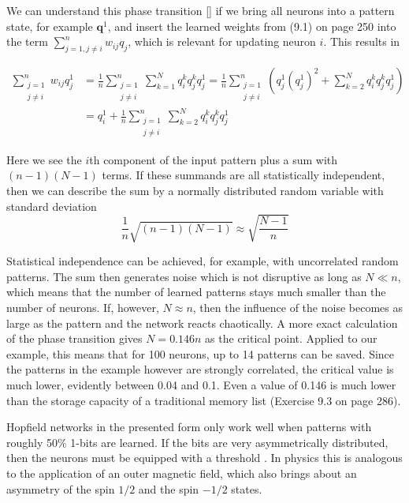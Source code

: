 \documentclass[10pt]{book}
\begin{document}
We can understand this phase transition [\cite{ritter1992som}] if we bring all neurons into a pattern state, for example $\boldsymbol{q}^{1}$, and insert the learned weights from (9.1) on page 250 into the term $\sum_{j=1, j \neq i}^{n} w_{i j} q_{j}$, which is relevant for updating neuron $i$. This results in

$$
\begin{aligned}
\sum_{\substack{j=1 \\
j \neq i}}^{n} w_{i j} q_{j}^{1} & =\frac{1}{n} \sum_{\substack{j=1 \\
j \neq i}}^{n} \sum_{k=1}^{N} q_{i}^{k} q_{j}^{k} q_{j}^{1}=\frac{1}{n} \sum_{\substack{j=1 \\
j \neq i}}^{n}\left(q_{j}^{1}\left(q_{j}^{1}\right)^{2}+\sum_{k=2}^{N} q_{i}^{k} q_{j}^{k} q_{j}^{1}\right) \\
& =q_{i}^{1}+\frac{1}{n} \sum_{\substack{j=1 \\
j \neq i}}^{n} \sum_{k=2}^{N} q_{i}^{k} q_{j}^{k} q_{j}^{1}
\end{aligned}
$$

Here we see the $i$th component of the input pattern plus a sum with $(n-1)(N-1)$ terms. If these summands are all statistically independent, then we can describe the sum by a normally distributed random variable with standard deviation
\[
\frac{1}{n}\sqrt{(n-1)(N-1)} \approx \sqrt{\frac{N-1}{n}}
\]

Statistical independence can be achieved, for example, with uncorrelated random patterns. The sum then generates noise which is not disruptive as long as $N \ll n$, which means that the number of learned patterns stays much smaller than the number of neurons. If, however, $N \approx n$, then the influence of the noise becomes as large as the pattern and the network reacts chaotically. A more exact calculation of the phase transition gives $N=0.146 n$ as the critical point. Applied to our example, this means that for 100 neurons, up to 14 patterns can be saved. Since the patterns in the example however are strongly correlated, the critical value is much lower, evidently between 0.04 and 0.1. Even a value of 0.146 is much lower than the storage capacity of a traditional memory list (Exercise 9.3 on page 286).

Hopfield networks in the presented form only work well when patterns with roughly 50\% 1-bits are learned. If the bits are very asymmetrically distributed, then the neurons must be equipped with a threshold \cite{rojas1996nn}. In physics this is analogous to the application of an outer magnetic field, which also brings about an asymmetry of the spin $1/2$ and the spin $-1/2$ states.
\end{document}
